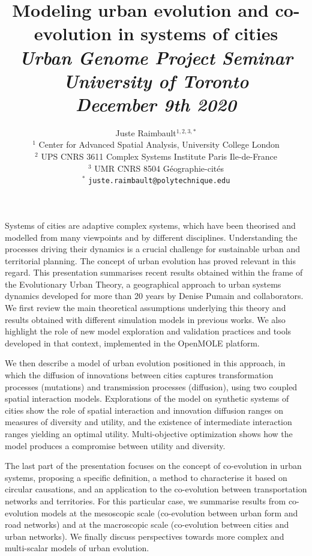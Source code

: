 \documentclass[10pt]{article}
\title{Modeling urban evolution and co-evolution in systems of cities\medskip\\
\textit{Urban Genome Project Seminar}\\
\textit{University of Toronto}\\
\textit{December 9th 2020}}
\author{Juste Raimbault$^{1,2,3,\ast}$\medskip\\
$^{1}$ Center for Advanced Spatial Analysis, University College London\\
$^{2}$ UPS CNRS 3611 Complex Systems Institute Paris Ile-de-France\\
$^{3}$ UMR CNRS 8504 G{\'e}ographie-cit{\'e}s\medskip\\
$^{\ast}$ \texttt{juste.raimbault@polytechnique.edu}
}
\date{}
\begin{document}
\maketitle

Systems of cities are adaptive complex systems, which have been theorised and modelled from many viewpoints and by different disciplines. Understanding the processes driving their dynamics is a crucial challenge for sustainable urban and territorial planning. The concept of urban evolution has proved relevant in this regard. This presentation summarises recent results obtained within the frame of the Evolutionary Urban Theory, a geographical approach to urban systems dynamics developed for more than 20 years by Denise Pumain and collaborators. We first review the main theoretical assumptions underlying this theory and results obtained with different simulation models in previous works. We also highlight the role of new model exploration and validation practices and tools developed in that context, implemented in the OpenMOLE platform.

We then describe a model of urban evolution positioned in this approach, in which the diffusion of innovations between cities captures transformation processes (mutations) and transmission processes (diffusion), using two coupled spatial interaction models. Explorations of the model on synthetic systems of cities show the role of spatial interaction and innovation diffusion ranges on measures of diversity and utility, and the existence of intermediate interaction ranges yielding an optimal utility. Multi-objective optimization shows how the model produces a compromise between utility and diversity.

The last part of the presentation focuses on the concept of co-evolution in urban systems, proposing a specific definition, a method to characterise it based on circular causations, and an application to the co-evolution between transportation networks and territories. For this particular case, we summarise results from co-evolution models at the mesoscopic scale (co-evolution between urban form and road networks) and at the macroscopic scale (co-evolution between cities and urban networks). We finally discuss perspectives towards more complex and multi-scalar models of urban evolution.


	
\end{document}
